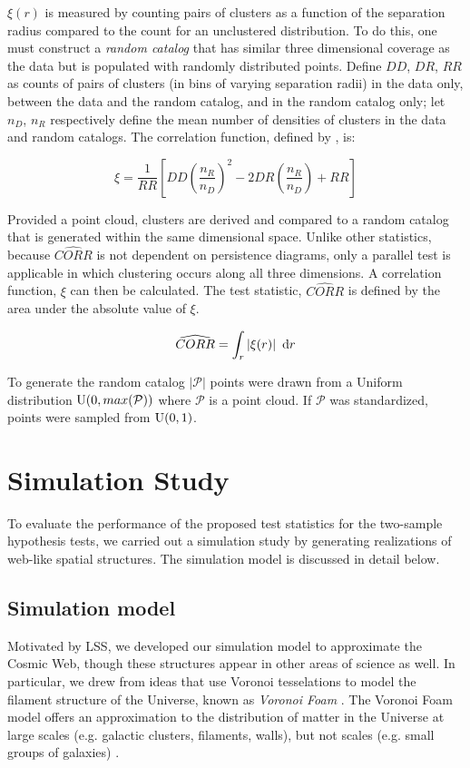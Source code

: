 \documentclass[12pt]{article}
\begin{document}
$\xi(r)$ is measured by counting pairs of clusters as a function of the separation radius compared to the count for an unclustered distribution. To do this, one must construct a \textit{random catalog} that has similar three dimensional coverage as the data but is populated with randomly distributed points. Define $DD$, $DR$, $RR$ as counts of pairs of clusters (in bins of varying separation radii) in the data only, between the data and the random catalog, and in the random catalog only; let $n_{D}$, $n_{R}$ respectively define the mean number of densities of clusters in the data and random catalogs. The correlation function, defined by \citep{landy1993bias}, is:

\[ \xi = \frac{1}{RR}\left[DD\left(\frac{n_{R}}{n_{D}}\right)^{2} - 2DR\left(\frac{n_{R}}{n_{D}}\right) + RR\right] \]

Provided a point cloud, clusters are derived and compared to a random catalog that is generated within the same dimensional space. Unlike other statistics, because $\widehat{CORR}$ is not dependent on persistence diagrams, only a parallel test is applicable in which clustering occurs along all three dimensions. A correlation function, $\xi$ can then be calculated. The test statistic, $\widehat{CORR}$ is defined by the area under the absolute value of $\xi$.

\[ \widehat{CORR} = \int_{r} \left | \xi(r) \right | \textup{ d}r \]

To generate the random catalog $\left | \mathcal P \right |$ points were drawn from a Uniform distribution $\textup{U}(0, max(\mathcal P))$ where $\mathcal P$ is a point cloud. If $\mathcal P$ was standardized, points were sampled from $\textup{U}(0, 1)$. 


\section{Simulation Study}
\label{sec:simulation}

To evaluate the performance of the proposed test statistics for the two-sample hypothesis tests, we carried out a simulation study by generating realizations of web-like spatial structures.  The simulation model is discussed in detail below. 

\subsection{Simulation model} \label{sec:sim_model} %
Motivated by LSS, we developed our simulation model to approximate the Cosmic Web, though these structures appear in other areas of science as well.  In particular, we drew from ideas that use Voronoi tesselations to model the filament structure of the Universe, known as \emph{Voronoi Foam} \citep{icke1987fragmenting, icke1991galaxy, van2007voronoi}.  The Voronoi Foam model offers an approximation to the distribution of matter in the Universe at large scales (e.g. galactic clusters, filaments, walls), but not scales (e.g. small groups of galaxies) \citep{icke1991galaxy}.
\end{document}
